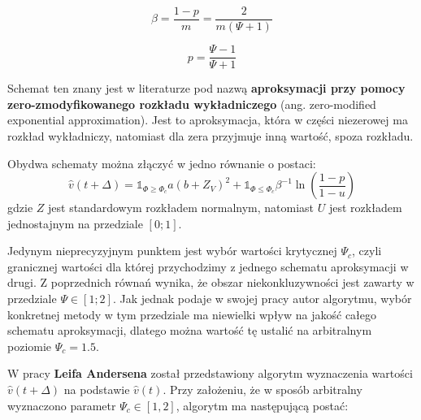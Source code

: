 \documentclass{pracamgr}
\begin{document}
\begin{equation}
\label{eq:beta}
\beta = \frac{1-p}{m} = \frac{2}{m(\Psi + 1)}
\end{equation}

\begin{equation}
\label{eq:p}
p = \frac{\Psi - 1}{\Psi + 1}
\end{equation}

Schemat ten znany jest w literaturze pod nazwą \textbf{aproksymacji przy pomocy 
zero-zmodyfikowanego rozkładu wykładniczego} (ang. zero-modified exponential approximation). 
Jest to aproksymacja, która w części niezerowej ma 
rozkład wykładniczy, natomiast dla zera przyjmuje inną wartość, spoza rozkładu. 


Obydwa schematy można złączyć w jedno równanie o postaci:
\begin{equation}
\label{eq:andersen}
\hat{v}(t + \Delta)  = \mathds{1}_{\Phi \geq \Phi_c} a (b + Z_V)^2
 + \mathds{1}_{\Phi \le \Phi_c} \beta^{-1} \ln (\frac{1-p}{1-u})
\end{equation}
gdzie $Z$ jest standardowym rozkładem normalnym, natomiast $U$ jest rozkładem jednostajnym na 
przedziale $[0;1]$.


Jedynym nieprecyzyjnym punktem jest wybór wartości krytycznej $\Psi_c$, czyli granicznej wartości dla 
której przychodzimy z jednego schematu aproksymacji w drugi. 
Z poprzednich równań wynika, że obszar niekonkluzywności jest zawarty w przedziale $\Psi \in [1;2]$.
Jak jednak podaje w swojej pracy autor algorytmu, wybór konkretnej metody w tym przedziale ma 
niewielki wpływ na jakość całego schematu aproksymacji, dlatego można wartość tę ustalić na 
arbitralnym poziomie $\Psi_c = 1.5$. 
 


W pracy \textbf{Leifa Andersena} \cite{Andersen} został 
przedstawiony algorytm wyznaczenia 
wartości $\hat{v}(t + \Delta)$ na podstawie $\hat{v}(t)$. Przy założeniu, 
że w sposób arbitralny wyznaczono parametr $\Psi_c \in [1,2]$, algorytm 
ma następującą postać:
\end{document}
